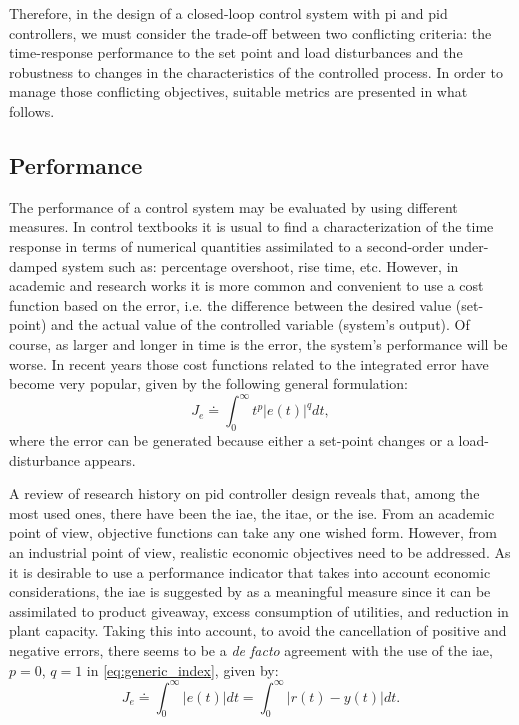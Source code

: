 Therefore, in the design of a closed-loop control system with \gls{pi} and \gls{pid} controllers, we must consider the trade-off between two conflicting criteria: the time-response performance to the set point and load disturbances and the robustness to changes in the characteristics of the controlled process. In order to manage those conflicting objectives, suitable metrics are presented in what follows.
 
\subsection{Performance}
%
The performance of a control system may be evaluated by using different measures. In control textbooks it is usual to find a characterization of the time response in terms of numerical quantities assimilated to a second-order under-damped system such as: percentage overshoot, rise time, etc. However, in academic and research works it is more common and convenient to use a cost function based on the error, i.e. the difference between the desired value (set-point) and the actual value of the controlled variable (system's output).  Of course, as larger and longer in time is the error, the system's performance will be worse. In recent years those cost functions related to the integrated error have become very popular, given by the following general formulation:
%
\begin{equation}
	J_{e} \doteq \int^{\infty}_{0} t^p \left|e(t)\right|^q dt,  \label{eq:generic_index}
\end{equation}
%
where the error can be generated because either a set-point changes or a load-disturbance appears.

A review of research history on \gls{pid} controller design reveals that, among the most used ones, there have been the \gls{iae}, the \gls{itae}, or the \gls{ise}. From an academic point of view, objective functions can take any one wished form. However, from an industrial point of view, realistic economic objectives need to be addressed. As it is desirable to use a performance indicator that takes into account economic considerations, the \gls{iae} is suggested by \citet{Shinskey2002} as a meaningful measure since it can be assimilated to product giveaway, excess consumption of utilities, and reduction in plant capacity. Taking this into account, to avoid the cancellation of positive and negative errors, there seems to be a \emph{de facto} agreement with the use of the \gls{iae}, $p=0$, $q=1$ in \eqref{eq:generic_index}, given by:
%
\begin{equation}
	J_e \doteq \int^{\infty}_{0} \left|e(t) \right| dt = \int^{\infty}_{0} \left|r(t)-y(t) \right| dt. 
\end{equation}
%
%

